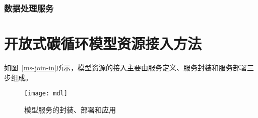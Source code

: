 \subsubsection{数据处理服务}

\section{开放式碳循环模型资源接入方法}
如图~\ref{ms-join-in}所示，模型资源的接入主要由服务定义、服务封装和服务部署三步组成。

\begin{figure}[!htbp]
    \centering
    \texttt{[image: mdl]}
    \caption{模型服务的封装、部署和应用}
    \label{fig:ms-join-in}
\end{figure}

